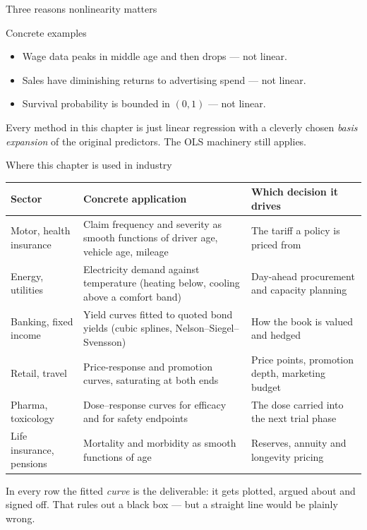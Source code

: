 \documentclass[aspectratio=169,11pt]{beamer}
\begin{document}
\begin{frame}{Three reasons nonlinearity matters}
  \begin{block}{Concrete examples}
    \begin{itemize}
      \item Wage data peaks in middle age and then drops --- not linear.
      \item Sales have diminishing returns to advertising spend --- not
            linear.
      \item Survival probability is bounded in $(0,1)$ --- not linear.
    \end{itemize}
  \end{block}
  \begin{takeaway}
    Every method in this chapter is just linear regression with a
    cleverly chosen \emph{basis expansion} of the original predictors.
    The OLS machinery still applies.
  \end{takeaway}
\end{frame}

\begin{frame}{Where this chapter is used in industry}
  \scriptsize
  \begin{center}
  \begin{tabular}{@{}p{2.5cm}p{5.5cm}p{4.7cm}@{}}
    \toprule
    \textbf{Sector} & \textbf{Concrete application} & \textbf{Which decision it drives} \\
    \midrule
    Motor, health insurance & Claim frequency and severity as smooth functions of driver age, vehicle age, mileage & The tariff a policy is priced from \\
    Energy, utilities & Electricity demand against temperature (heating below, cooling above a comfort band) & Day-ahead procurement and capacity planning \\
    Banking, fixed income & Yield curves fitted to quoted bond yields (cubic splines, Nelson--Siegel--Svensson) & How the book is valued and hedged \\
    Retail, travel & Price-response and promotion curves, saturating at both ends & Price points, promotion depth, marketing budget \\
    Pharma, toxicology & Dose--response curves for efficacy and for safety endpoints & The dose carried into the next trial phase \\
    Life insurance, pensions & Mortality and morbidity as smooth functions of age & Reserves, annuity and longevity pricing \\
    \bottomrule
  \end{tabular}
  \end{center}
  \begin{industry}
    In every row the fitted \emph{curve} is the deliverable: it gets plotted, argued about and signed off. That rules out a black box --- but a straight line would be plainly wrong.
  \end{industry}
\end{frame}
\end{document}
